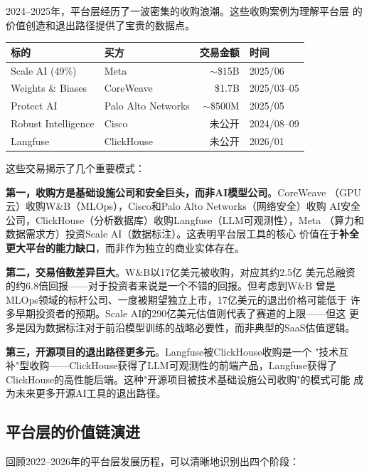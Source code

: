 2024--2025年，平台层经历了一波密集的收购浪潮。这些收购案例为理解平台层
的价值创造和退出路径提供了宝贵的数据点。

\begin{keybox}
\small
\begin{tabularx}{\textwidth}{l l r l}
\toprule
\rowcolor{figLightGray}
\textbf{标的} & \textbf{买方} & \textbf{交易金额} & \textbf{时间} \\
\midrule
Scale AI (49\%)      & Meta                  & $\sim$\$15B   & 2025/06 \\
Weights \& Biases    & CoreWeave             & \$1.7B        & 2025/03--05 \\
Protect AI           & Palo Alto Networks    & $\sim$\$500M  & 2025/05 \\
Robust Intelligence  & Cisco                 & 未公开        & 2024/08--09 \\
Langfuse             & ClickHouse            & 未公开        & 2026/01 \\
\bottomrule
\end{tabularx}
\end{keybox}

这些交易揭示了几个重要模式：

\textbf{第一，收购方是基础设施公司和安全巨头，而非AI模型公司}。CoreWeave
（GPU云）收购W\&B（MLOps），Cisco和Palo Alto Networks（网络安全）收购
AI安全公司，ClickHouse（分析数据库）收购Langfuse（LLM可观测性），Meta
（算力和数据需求方）投资Scale AI（数据标注）。这表明平台层工具的核心
价值在于\textbf{补全更大平台的能力缺口}，而非作为独立的商业实体存在。

\textbf{第二，交易倍数差异巨大}。W\&B以17亿美元被收购，对应其约2.5亿
美元总融资的约6.8倍回报——对于投资者来说是一个不错的回报。但考虑到W\&B
曾是MLOps领域的标杆公司、一度被期望独立上市，17亿美元的退出价格可能低于
许多早期投资者的预期。Scale AI的290亿美元估值则代表了赛道的上限——但这
更多是因为数据标注对于前沿模型训练的战略必要性，而非典型的SaaS估值逻辑。

\textbf{第三，开源项目的退出路径更多元}。Langfuse被ClickHouse收购是一个
"技术互补"型收购——ClickHouse获得了LLM可观测性的前端产品，Langfuse获得了
ClickHouse的高性能后端。这种"开源项目被技术基础设施公司收购"的模式可能
成为未来更多开源AI工具的退出路径。

\subsection{平台层的价值链演进}

回顾2022--2026年的平台层发展历程，可以清晰地识别出四个阶段：

